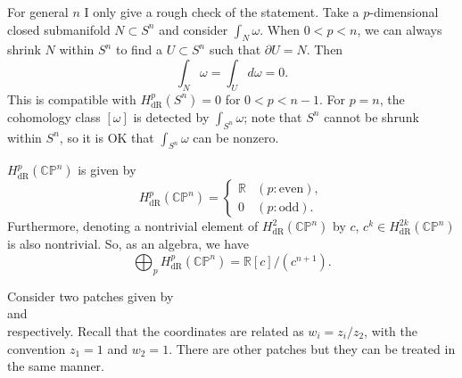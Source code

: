 \documentclass[12pt]{article}
\numberwithin{equation}{section}
\theoremstyle{remark}
\def\bR{\mathbb{R}}
\def\CP{\mathbb{CP}}
\begin{document}
For general $n$ I only give a rough check of the statement.
Take a $p$-dimensional closed submanifold $N\subset S^n$
and consider  $\int_N \omega$.
When $0<p<n$,
we can always shrink $N$ within $S^n$ to find a $U\subset S^n$ such that $\partial U=N$.
Then \begin{equation}
\int_N \omega=\int_{U} d\omega=0.
\end{equation}
This is compatible with $H^p_\text{dR}(S^n)=0$ for $0<p<n-1$.
For $p=n$, the cohomology class $[\omega]$ is detected by $\int_{S^n} \omega$; 
note that $S^n$ cannot be shrunk within $S^n$, so it is OK that $\int_{S^n}\omega$ can be nonzero.


\begin{example}
$H^p_\text{dR}(\CP^n)$ is given by \[
H^p_\text{dR}(\CP^n)= \begin{cases}
\bR & (p: \text{even}), \\
0 & (p: \text{odd}) .
\end{cases}
\]
Furthermore, denoting a nontrivial element of $H^2_\text{dR}(\CP^n)$ by $c$,
$c^k \in H^{2k}_\text{dR}(\CP^n)$  is also nontrivial. 
So, as an algebra, we have \[
\bigoplus_p H^p_\text{dR}(\CP^n) = \bR[c]/(c^{n+1}).
\]
\end{example}

Consider two patches given by \begin{equation}
[1:z_2:z_3:\cdots:z_{n+1}]
\end{equation} and \begin{equation}
[w_1: 1: w_3:\cdots:w_{n+1}]
\end{equation} respectively. Recall that the coordinates are related as $w_i = z_i/z_2$, with the convention $z_1=1$ and $w_2=1$. 
There are other patches but they can be treated in the same manner.
\end{document}
